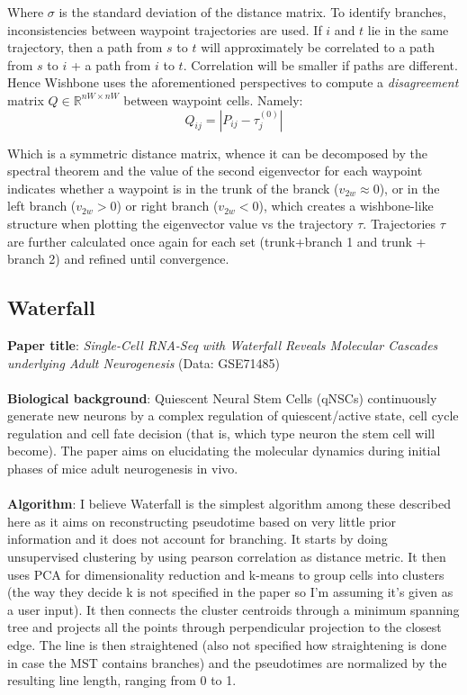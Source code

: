 \documentclass[11pt]{article}
\begin{document}
Where $\sigma$ is the standard deviation of the distance matrix. To identify branches, inconsistencies between waypoint trajectories are used. If $i$ and $t$ lie in the same trajectory, then a path from $s$ to $t$ will approximately be correlated to a path from $s$ to $i$ + a path from $i$ to $t$. Correlation will be smaller if paths are different. Hence Wishbone uses the aforementioned perspectives to compute a \emph{disagreement} matrix $Q \in \mathbb{R}^{nW \times nW}$ between waypoint cells. Namely:
$$
Q_{ij} = |P_{ij} - \tau_{j}^{(0)}|
$$

Which is a symmetric distance matrix, whence it can be decomposed by the spectral theorem and the value of the second eigenvector for each waypoint indicates whether a waypoint is in the trunk of the branck ($v_{2w} \approx 0$), or in the left branch ($v_{2w} >0$) or right branch ($v_{2w} < 0$), which creates a wishbone-like structure when plotting the eigenvector value vs the trajectory $\tau$. Trajectories $\tau$ are further calculated once again for each set (trunk+branch 1 and trunk + branch 2) and refined until convergence. 

\subsection{Waterfall}
\textbf{Paper title}: \emph{Single-Cell RNA-Seq with Waterfall Reveals
Molecular Cascades underlying Adult Neurogenesis} (Data: GSE71485)\\
\\
\textbf{Biological background}: Quiescent Neural Stem Cells (qNSCs) continuously generate new neurons by a complex regulation of quiescent/active state, cell cycle regulation and cell fate decision (that is, which type neuron the stem cell will become). The paper aims on elucidating the molecular dynamics during initial phases of mice adult neurogenesis in vivo. \\
\\
\textbf{Algorithm}: I believe Waterfall is the simplest algorithm among these described here as it aims on reconstructing pseudotime based on very little prior information and it does not account for branching. It starts by doing unsupervised clustering by using pearson correlation as distance metric. It then uses PCA for dimensionality reduction and k-means to group cells into clusters (the way they decide k is not specified in the paper so I'm assuming it's given as a user input). It then connects the cluster centroids through a minimum spanning tree and projects all the points through perpendicular projection to the closest edge. The line is then straightened (also not specified how straightening is done in case the MST contains branches) and the pseudotimes are normalized by the resulting line length, ranging from 0 to 1. 
 
\end{document}
